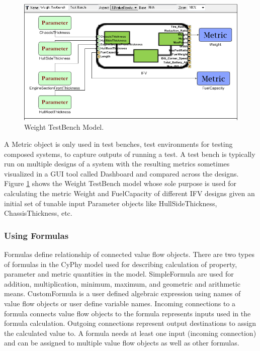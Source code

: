 \begin{figure}[t]
\centering
\includegraphics[scale=0.40]{Figures/Metric_VF.png}
\caption{Weight TestBench Model.}
\label{fig:metricVF}
\end{figure}
A Metric object is only used in test benches, test environments for testing composed systems, to capture outputs of running a test. A test bench is typically run on multiple designs of a system with the resulting metrics sometimes visualized in a GUI tool called Dashboard and compared across the designs. Figure \ref{fig:metricVF} shows the Weight TestBench model whose sole purpose is used for calculating the metric Weight and FuelCapacity of different IFV designs given an initial set of tunable input Parameter objects like HullSideThickness, ChassisThickness, etc.

\subsubsection{Using Formulas}
Formulas define relationship of connected value flow objects. There are two types of formulas in the CyPhy model used for describing calculation of property, parameter and metric quantities in the model. SimpleFormula are used for addition, multiplication, minimum, maximum, and geometric and arithmetic means. CustomFormula is a user defined algebraic expression using names of value flow objects or user define variable names. Incoming connections to a formula connects value flow objects  to the formula represents inputs used in the formula calculation. Outgoing connections represent output destinations to assign the calculated value to. A formula needs at least one input (incoming connection) and can be assigned to multiple value flow objects as well as other formulas.

